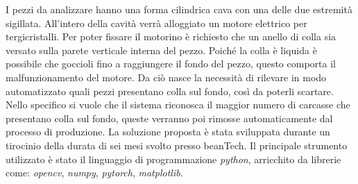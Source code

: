 \documentclass[a0,portrait]{a0poster}
\begin{document}
\begin{multicols}{2}
I pezzi da analizzare hanno una forma cilindrica cava con una delle due estremità sigillata.
All'intero della cavità verrà alloggiato un motore elettrico per tergicristalli.
Per poter fissare il motorino è richiesto che un anello di colla sia versato sulla parete verticale interna del pezzo.
Poiché la colla è liquida è possibile che goccioli fino a raggiungere il fondo del pezzo, questo comporta il malfunzionamento del motore.
Da ciò nasce la necessità di rilevare in modo automatizzato quali pezzi presentano colla sul fondo, così da poterli scartare.
Nello specifico si vuole che il sistema riconosca il maggior numero di carcasse che presentano colla sul fondo, queste verranno poi rimosse automaticamente dal processo di produzione.
La soluzione proposta è stata sviluppata durante un tirocinio della durata di sei mesi svolto presso beanTech.
Il principale strumento utilizzato è stato il linguaggio di programmazione \textit{python}, arricchito da librerie come: \textit{opencv}, \textit{numpy}, \textit{pytorch}, \textit{matplotlib}.


\color{DarkSlateGray} %

\end{multicols}
\end{document}
